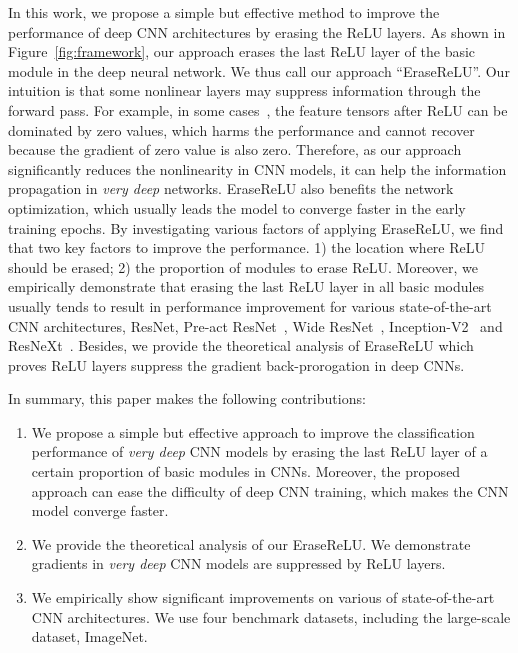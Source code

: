 \documentclass[10pt,twocolumn,letterpaper]{article}
\begin{document}
In this work, we propose a simple but effective method to improve the performance of deep CNN architectures by erasing the ReLU layers.
As shown in Figure~\ref{fig:framework}, our approach erases the last ReLU layer of the basic module in the deep neural network.
We thus call our approach ``EraseReLU''.
Our intuition is that some nonlinear layers may suppress information through the forward pass.
For example, in some cases~\cite{dong2017more}, the feature tensors after ReLU can be dominated by zero values, which harms the performance and cannot recover because the gradient of zero value is also zero.
Therefore, as our approach significantly reduces the nonlinearity in CNN models, it can help the information propagation in \textit{very deep} networks. EraseReLU also benefits the network optimization, which usually leads the model to converge faster in the early training epochs.
By investigating various factors of applying EraseReLU,
we find that two key factors to improve the performance.
1) the location where ReLU should be erased; 2) the proportion of modules to erase ReLU.
Moreover, we empirically demonstrate that erasing the last ReLU layer in all basic modules usually tends to result in performance improvement for various state-of-the-art CNN architectures, ResNet, Pre-act ResNet~\cite{he2016identity}, Wide ResNet~\cite{zagoruyko2016wide}, Inception-V2~\cite{ioffe2015batch} and ResNeXt~\cite{xie2017aggregated}.
Besides, we provide the theoretical analysis of EraseReLU which proves ReLU layers suppress the gradient back-prorogation in deep CNNs.

In summary, this paper makes the following contributions:
\begin{enumerate}
\itemsep0em 
\item We propose a simple but effective approach to improve the classification performance of \textit{very deep} CNN models by erasing the last ReLU layer of a certain proportion of basic modules in CNNs.
	  Moreover, the proposed approach can ease the difficulty of deep CNN training, which makes the CNN model converge faster.
\item We provide the theoretical analysis of our EraseReLU. We demonstrate gradients in \textit{very deep} CNN models are suppressed by ReLU layers.
\item We empirically show significant improvements on various of state-of-the-art CNN architectures. We use four benchmark datasets, including the large-scale dataset, ImageNet.
\end{enumerate}
\end{document}
